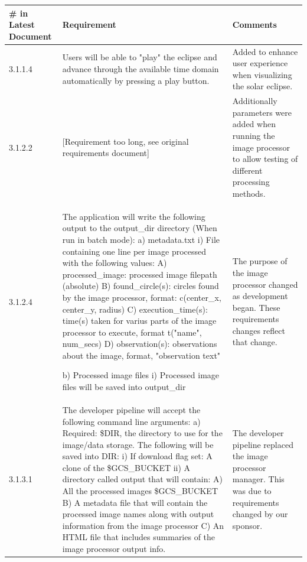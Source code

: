 \documentclass[10pt, onecolumn, draftclsnofoot, letterpaper, compsoc]{IEEEtran}
\begin{document}
\begin{longtable}{| p{} | p{} | p{} |}
\hline
\textbf{\# in Latest Document} & \textbf{Requirement} & \textbf{Comments} \\ \hline

    3.1.1.4 &
	Users will be able to "play" the eclipse and advance through the available
    time domain automatically by pressing a play button. &
	Added to enhance user experience when visualizing the solar eclipse.
	\\ \hline

    3.1.2.2 &
	[Requirement too long, see original requirements document] &
	Additionally parameters were added when running the image processor to allow
    testing of different processing methods.
	\\ \hline

    3.1.2.4 &
    The application will write the following output to the output\_dir directory
    (When run in batch mode):
    a) metadata.txt
    i) File containing one line per image processed with the following values:
    A) processed\_image: processed image filepath (absolute)
    B) found\_circle(s): circles found by the image processor, format: c(center\_x, center\_y, radius)
    C) execution\_time(s): time(s) taken for varius parts of the image processor
    to execute, format t("name", num\_secs)
    D) observation(s): observations about the image, format, "observation text"

    b) Processed image files
    i) Processed image files will be saved into output\_dir &
    The purpose of the image processor changed as development began. These
    requirements changes reflect that change.
    \\ \hline

    3.1.3.1 &
    The developer pipeline will accept the following command line arguments:
    a) Required: \$DIR, the directory to use for the image/data storage. The
    following will be saved into DIR:
    i) If download flag set: A clone of the \$GCS\_BUCKET
    ii) A directory called output that will contain:
    A) All the processed images \$GCS\_BUCKET
    B) A metadata file that will contain the processed image names along with
    output information from the image processor
    C) An HTML file that includes summaries of the image processor output info. &
    The developer pipeline replaced the image processor manager. This was due to
    requirements changed by our sponsor.
    \\ \hline


\end{longtable}
\end{document}
